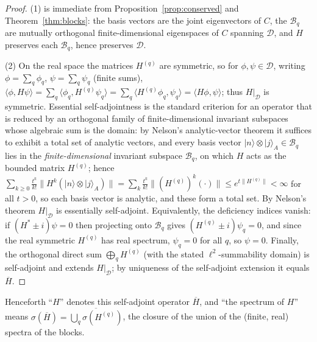 \documentclass[12pt]{article}
\theoremstyle{definition}
\theoremstyle{remark}
\newcommand{\ket}[1]{\lvert #1\rangle}
\begin{document}
\begin{proof}
(1) is immediate from Proposition~\ref{prop:conserved} and
Theorem~\ref{thm:blocks}: the basis vectors are the joint eigenvectors of $C$, the
$\mathcal B_q$ are mutually orthogonal finite-dimensional eigenspaces of $C$ spanning
$\mathcal D$, and $H$ preserves each $\mathcal B_q$, hence preserves $\mathcal D$.

(2) On the real space the matrices $H^{(q)}$ are symmetric, so for
$\phi,\psi\in\mathcal D$, writing $\phi=\sum_q\phi_q$, $\psi=\sum_q\psi_q$ (finite
sums), $\langle\phi,H\psi\rangle=\sum_q\langle\phi_q,H^{(q)}\psi_q\rangle
=\sum_q\langle H^{(q)}\phi_q,\psi_q\rangle=\langle H\phi,\psi\rangle$; thus
$H|_{\mathcal D}$ is symmetric. Essential self-adjointness is the standard criterion
for an operator that is reduced by an orthogonal family of finite-dimensional
invariant subspaces whose algebraic sum is the domain: by Nelson's analytic-vector
theorem it suffices to exhibit a total set of analytic vectors, and every basis
vector $\ket n\otimes\ket j_A\in\mathcal B_q$ lies in the
\emph{finite-dimensional} invariant subspace $\mathcal B_q$, on which $H$ acts as the
bounded matrix $H^{(q)}$; hence $\sum_{k\ge0}\frac{t^k}{k!}\|H^k(\ket n\otimes\ket j_A)\|
=\sum_k\frac{t^k}{k!}\|(H^{(q)})^k(\cdot)\|\le e^{t\|H^{(q)}\|}<\infty$ for all
$t>0$, so each basis vector is analytic, and these form a total set. By Nelson's
theorem $H|_{\mathcal D}$ is essentially self-adjoint. Equivalently, the deficiency
indices vanish: if $(H^*\pm i)\psi=0$ then projecting onto $\mathcal B_q$ gives
$(H^{(q)}\pm i)\psi_q=0$, and since the real symmetric $H^{(q)}$ has real spectrum,
$\psi_q=0$ for all $q$, so $\psi=0$. Finally, the orthogonal direct sum
$\bigoplus_q H^{(q)}$ (with the stated $\ell^2$-summability domain) is self-adjoint
and extends $H|_{\mathcal D}$; by uniqueness of the self-adjoint extension it equals
$\overline H$.
\end{proof}

Henceforth ``$H$'' denotes this self-adjoint operator $\overline H$, and ``the
spectrum of $H$'' means $\sigma(\overline H)=\overline{\bigcup_q\sigma(H^{(q)})}$,
the closure of the union of the (finite, real) spectra of the blocks.
\end{document}
